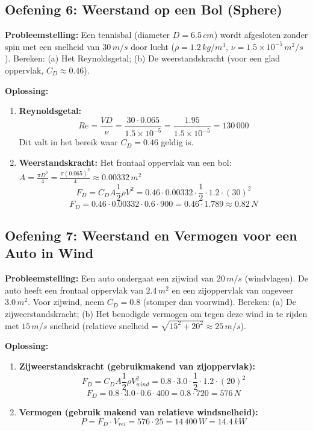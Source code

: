 \documentclass[a4paper,11pt,twoside]{report}
\begin{document}
\subsection{Oefening 6: Weerstand op een Bol (Sphere)}
\textbf{Probleemstelling:}
Een tennisbal (diameter $D = 6.5 \, cm$) wordt afgesloten zonder spin met een snelheid van $30 \, m/s$ door lucht ($\rho = 1.2 \, kg/m^3$, $\nu = 1.5 \times 10^{-5} \, m^2/s$).
Bereken: (a) Het Reynoldsgetal; (b) De weerstandskracht (voor een glad oppervlak, $C_D \approx 0.46$).

\textbf{Oplossing:}
\begin{enumerate}
    \item \textbf{Reynoldsgetal:}
    \[ Re = \frac{VD}{\nu} = \frac{30 \cdot 0.065}{1.5 \times 10^{-5}} = \frac{1.95}{1.5 \times 10^{-5}} = 130\,000 \]
    Dit valt in het bereik waar $C_D = 0.46$ geldig is.
    
    \item \textbf{Weerstandskracht:}
    Het frontaal oppervlak van een bol: $A = \frac{\pi D^2}{4} = \frac{\pi (0.065)^2}{4} \approx 0.00332 \, m^2$
    \[ F_D = C_D A \frac{1}{2}\rho V^2 = 0.46 \cdot 0.00332 \cdot \frac{1}{2} \cdot 1.2 \cdot (30)^2 \]
    \[ F_D = 0.46 \cdot 0.00332 \cdot 0.6 \cdot 900 = 0.46 \cdot 1.789 \approx 0.82 \, N \]
\end{enumerate}

\subsection{Oefening 7: Weerstand en Vermogen voor een Auto in Wind}
\textbf{Probleemstelling:}
Een auto ondergaat een zijwind van $20 \, m/s$ (windvlagen). De auto heeft een frontaal oppervlak van $2.4 \, m^2$ en een zijoppervlak van ongeveer $3.0 \, m^2$. Voor zijwind, neem $C_D = 0.8$ (stomper dan voorwind).
Bereken: (a) De zijweerstandskracht; (b) Het benodigde vermogen om tegen deze wind in te rijden met $15 \, m/s$ snelheid (relatieve snelheid = $\sqrt{15^2 + 20^2} \approx 25 \, m/s$).

\textbf{Oplossing:}
\begin{enumerate}
    \item \textbf{Zijweerstandskracht (gebruikmakend van zijoppervlak):}
    \[ F_D = C_D A \frac{1}{2}\rho V_{wind}^2 = 0.8 \cdot 3.0 \cdot \frac{1}{2} \cdot 1.2 \cdot (20)^2 \]
    \[ F_D = 0.8 \cdot 3.0 \cdot 0.6 \cdot 400 = 0.8 \cdot 720 = 576 \, N \]
    
    \item \textbf{Vermogen (gebruik makend van relatieve windsnelheid):}
    \[ P = F_D \cdot V_{rel} = 576 \cdot 25 = 14\,400 \, W = 14.4 \, kW \]
\end{enumerate}
\end{document}
